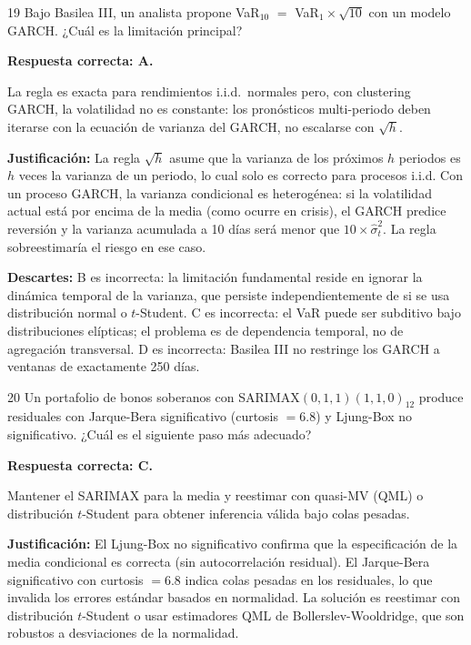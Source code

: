 \documentclass[11pt,a4paper]{article}
\begin{document}
\begin{cajaCFA}{19}
Bajo Basilea III, un analista propone VaR$_{10}$ $=$ VaR$_1 \times\sqrt{10}$ con un modelo GARCH. ¿Cuál es la limitación principal?
\end{cajaCFA}

\textbf{Respuesta correcta: A.}

La regla es exacta para rendimientos i.i.d.\ normales pero, con clustering GARCH, la volatilidad no es constante: los pronósticos multi-periodo deben iterarse con la ecuación de varianza del GARCH, no escalarse con $\sqrt{h}$.

\textbf{Justificación:} La regla $\sqrt{h}$ asume que la varianza de los próximos $h$ periodos es $h$ veces la varianza de un periodo, lo cual solo es correcto para procesos i.i.d. Con un proceso GARCH, la varianza condicional es heterogénea: si la volatilidad actual está por encima de la media (como ocurre en crisis), el GARCH predice reversión y la varianza acumulada a 10 días será menor que $10\times\hat{\sigma}_t^2$. La regla sobreestimaría el riesgo en ese caso.

\textbf{Descartes:} B es incorrecta: la limitación fundamental reside en ignorar la dinámica temporal de la varianza, que persiste independientemente de si se usa distribución normal o $t$-Student. C es incorrecta: el VaR puede ser subditivo bajo distribuciones elípticas; el problema es de dependencia temporal, no de agregación transversal. D es incorrecta: Basilea III no restringe los GARCH a ventanas de exactamente 250 días.

\begin{cajaCFA}{20}
Un portafolio de bonos soberanos con SARIMAX$(0,1,1)(1,1,0)_{12}$ produce residuales con Jarque-Bera significativo (curtosis $=6.8$) y Ljung-Box no significativo. ¿Cuál es el siguiente paso más adecuado?
\end{cajaCFA}

\textbf{Respuesta correcta: C.}

Mantener el SARIMAX para la media y reestimar con quasi-MV (QML) o distribución $t$-Student para obtener inferencia válida bajo colas pesadas.

\textbf{Justificación:} El Ljung-Box no significativo confirma que la especificación de la media condicional es correcta (sin autocorrelación residual). El Jarque-Bera significativo con curtosis $=6.8$ indica colas pesadas en los residuales, lo que invalida los errores estándar basados en normalidad. La solución es reestimar con distribución $t$-Student o usar estimadores QML de Bollerslev-Wooldridge, que son robustos a desviaciones de la normalidad.
\end{document}
